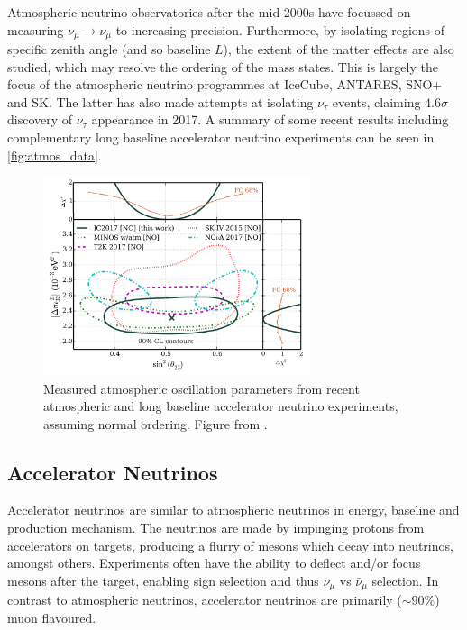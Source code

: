 Atmospheric neutrino observatories after the mid 2000s have focussed on measuring $\nu_\mu\rightarrow\nu_\mu$ to increasing precision. Furthermore, by isolating regions of specific zenith angle (and so baseline $L$), the extent of the matter effects are also studied, which may resolve the ordering of the mass states. This is largely the focus of the atmospheric neutrino programmes at IceCube\cite{icecube}, ANTARES\cite{antares}, SNO+ and SK. The latter has also made attempts at isolating $\nu_\tau$ events\cite{superk_tau}, claiming $4.6\sigma$ discovery of $\nu_\tau$ appearance in 2017. A summary of some recent results including complementary long baseline accelerator neutrino experiments can be seen in \autoref{fig:atmos_data}.
\begin{figure}[h]
	\includegraphics[width=0.7\textwidth, trim={0mm 0mm 0mm 0mm}, clip,page=1]{figures/theory/icecube_comp}
	\caption{Measured atmospheric oscillation parameters from recent atmospheric and long baseline accelerator neutrino experiments, assuming normal ordering. Figure from \cite{icecube}.}
	\label{fig:atmos_data}
\end{figure}

\subsection{Accelerator Neutrinos}
Accelerator neutrinos are similar to atmospheric neutrinos in energy, baseline and production mechanism. The neutrinos are made by impinging protons from accelerators on targets, producing a flurry of mesons which decay into neutrinos, amongst others. Experiments often have the ability to deflect and/or focus mesons after the target, enabling sign selection and thus $\nu_\mu$ vs $\bar{\nu}_\mu$ selection. In contrast to atmospheric neutrinos, accelerator neutrinos are primarily ($\sim90\%$) muon flavoured.

